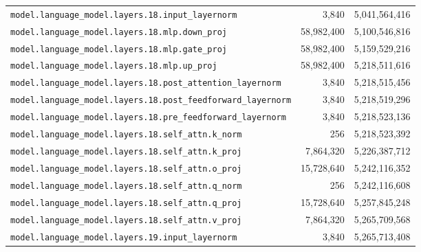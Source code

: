 \documentclass[10pt,a4paper]{article}
\theoremstyle{definition}
\begin{document}
\begin{appendices}
\begin{longtable}{p{9.5cm}rr}
\texttt{model.\allowbreak{}language\_model.\allowbreak{}layers.\allowbreak{}18.\allowbreak{}input\_layernorm} & 3,840 & 5,041,564,416 \\
\texttt{model.\allowbreak{}language\_model.\allowbreak{}layers.\allowbreak{}18.\allowbreak{}mlp.\allowbreak{}down\_proj} & 58,982,400 & 5,100,546,816 \\
\texttt{model.\allowbreak{}language\_model.\allowbreak{}layers.\allowbreak{}18.\allowbreak{}mlp.\allowbreak{}gate\_proj} & 58,982,400 & 5,159,529,216 \\
\texttt{model.\allowbreak{}language\_model.\allowbreak{}layers.\allowbreak{}18.\allowbreak{}mlp.\allowbreak{}up\_proj} & 58,982,400 & 5,218,511,616 \\
\texttt{model.\allowbreak{}language\_model.\allowbreak{}layers.\allowbreak{}18.\allowbreak{}post\_attention\_layernorm} & 3,840 & 5,218,515,456 \\
\texttt{model.\allowbreak{}language\_model.\allowbreak{}layers.\allowbreak{}18.\allowbreak{}post\_feedforward\_layernorm} & 3,840 & 5,218,519,296 \\
\texttt{model.\allowbreak{}language\_model.\allowbreak{}layers.\allowbreak{}18.\allowbreak{}pre\_feedforward\_layernorm} & 3,840 & 5,218,523,136 \\
\texttt{model.\allowbreak{}language\_model.\allowbreak{}layers.\allowbreak{}18.\allowbreak{}self\_attn.\allowbreak{}k\_norm} & 256 & 5,218,523,392 \\
\texttt{model.\allowbreak{}language\_model.\allowbreak{}layers.\allowbreak{}18.\allowbreak{}self\_attn.\allowbreak{}k\_proj} & 7,864,320 & 5,226,387,712 \\
\texttt{model.\allowbreak{}language\_model.\allowbreak{}layers.\allowbreak{}18.\allowbreak{}self\_attn.\allowbreak{}o\_proj} & 15,728,640 & 5,242,116,352 \\
\texttt{model.\allowbreak{}language\_model.\allowbreak{}layers.\allowbreak{}18.\allowbreak{}self\_attn.\allowbreak{}q\_norm} & 256 & 5,242,116,608 \\
\texttt{model.\allowbreak{}language\_model.\allowbreak{}layers.\allowbreak{}18.\allowbreak{}self\_attn.\allowbreak{}q\_proj} & 15,728,640 & 5,257,845,248 \\
\texttt{model.\allowbreak{}language\_model.\allowbreak{}layers.\allowbreak{}18.\allowbreak{}self\_attn.\allowbreak{}v\_proj} & 7,864,320 & 5,265,709,568 \\
\texttt{model.\allowbreak{}language\_model.\allowbreak{}layers.\allowbreak{}19.\allowbreak{}input\_layernorm} & 3,840 & 5,265,713,408 \\

\end{longtable}
\end{appendices}
\end{document}
